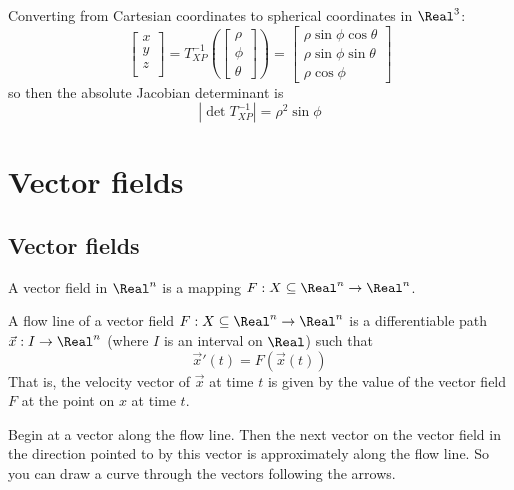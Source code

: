 \begin{example}
  Converting from Cartesian coordinates to spherical coordinates in $\Real^3$:
  \[
    \begin{bmatrix}
      x \\
      y \\
      z \\
    \end{bmatrix} = T_{XP}^{-1}\left(\begin{bmatrix}
      \rho \\
      \phi \\
      \theta
    \end{bmatrix}\right) = \begin{bmatrix}
      \rho \sin \phi \cos \theta \\
      \rho \sin \phi \sin \theta \\
      \rho \cos \phi
    \end{bmatrix}
  \]
  so then the absolute Jacobian determinant is
  \[
    \left| \det T_{XP}^{-1} \right| = \rho^2 \sin \phi
  \]
\end{example}

\section{Vector fields}

\subsection{Vector fields}

\begin{definition}
  A vector field in $\Real^n$ is a mapping $F : X \subseteq \Real^n \to \Real^n$.
\end{definition}

\begin{definition}
  A flow line of a vector field $F : X \subseteq \Real^n \to \Real^n$ is a differentiable path $\vec{x} : I \to \Real^n$ (where $I$ is an interval on $\Real$) such that
  \[
    \vec{x}'(t) = F(\vec{x}(t))
  \]
  That is, the velocity vector of $\vec{x}$ at time $t$ is given by the value of the vector field $F$ at the point on $x$ at time $t$.
\end{definition}

\begin{procedure}
  Begin at a vector along the flow line. Then the next vector on the vector field in the direction pointed to by this vector is approximately along the flow line. So you can draw a curve through the vectors following the arrows.
\end{procedure}

